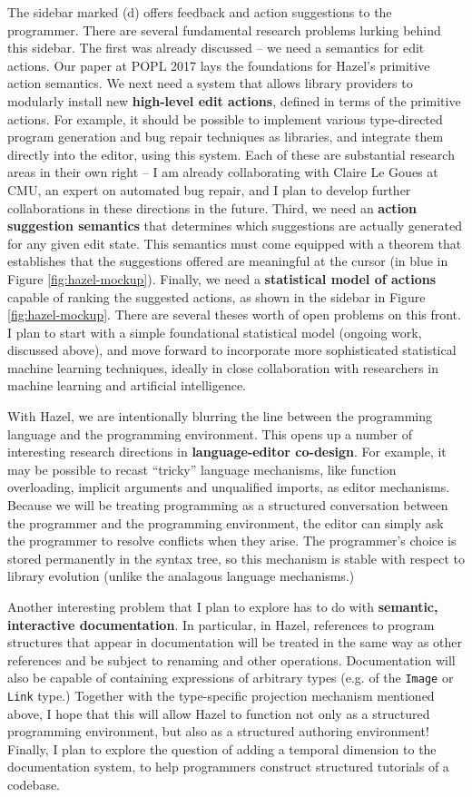 \documentclass[10pt]{article}
\let\li\lstinline
\begin{document}
The sidebar marked (d) offers feedback and action suggestions to the programmer. There are several fundamental research problems lurking behind this sidebar. The first was already discussed -- we need a semantics for edit actions. Our paper at POPL 2017 lays the foundations for Hazel's primitive action semantics. We next need a system that allows library providers to modularly install new \textbf{high-level edit actions}, defined in terms of the primitive actions. For example, it should be possible to implement various type-directed program generation and bug repair techniques as libraries, and integrate them directly into the editor, using this system. Each of these are substantial research areas in their own right -- I am already collaborating with Claire Le Goues at CMU, an expert on automated bug repair, and I plan to develop further collaborations in these directions in the future. Third, we need an \textbf{action suggestion semantics} that determines which suggestions are actually generated for any given edit state. This semantics must come equipped with a theorem that establishes that the suggestions offered are meaningful at the cursor (in blue in Figure \ref{fig:hazel-mockup}).  Finally, we need a \textbf{statistical model of actions} capable of ranking the suggested actions, as shown in the sidebar in Figure \ref{fig:hazel-mockup}. There are several theses worth of open problems on this front. I plan to start with a simple foundational statistical model (ongoing work, discussed above), and move forward to incorporate more sophisticated statistical machine learning techniques, ideally in close collaboration with researchers in machine learning and artificial intelligence.

With Hazel, we are intentionally blurring the line between the programming language and the programming environment. This opens up a number of interesting research directions in \textbf{language-editor co-design}. For example, it may be possible to recast  ``tricky'' language mechanisms, like function overloading, implicit arguments and unqualified imports, as editor mechanisms. Because we will be treating programming as a structured conversation between the programmer and the programming environment, the editor can simply ask the programmer to resolve conflicts when they arise. The programmer's choice is stored permanently in the syntax tree, so this mechanism is stable with respect to library evolution (unlike the analagous language mechanisms.) 

Another interesting problem that I plan to explore has to do with \textbf{semantic, interactive documentation}. In particular, in Hazel, references to program structures that appear in documentation will be treated in the same way as other references and be subject to renaming and other operations. Documentation will also be capable of containing expressions of arbitrary types (e.g. of the \li{Image} or \li{Link} type.) Together with the type-specific projection mechanism mentioned above, I hope that this will allow Hazel to function not only as a structured programming environment, but also as a structured authoring environment! Finally, I plan to explore the question of adding a temporal dimension to the documentation system, to help programmers construct structured tutorials of a codebase.
\end{document}
